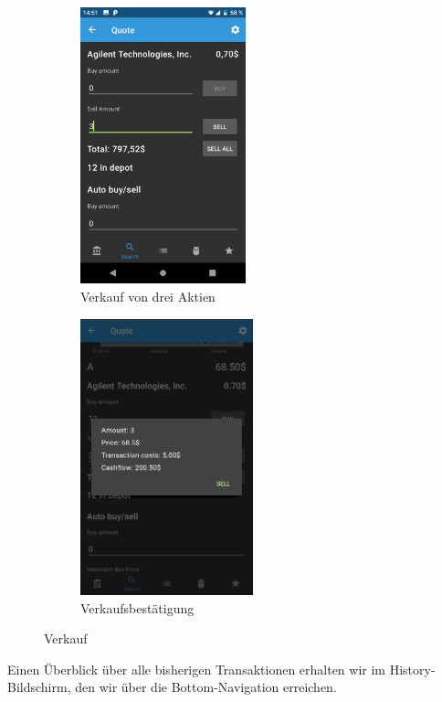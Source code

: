 \documentclass[a4paper]{article}
\begin{document}
\begin{figure}[H]
	\begin{subfigure}{.5\textwidth}
		\centering
		\includegraphics[height=8cm,keepaspectratio]{./images/demo/sell.png}
		\caption{Verkauf von drei Aktien}
		\label{fig:demo:sell_a_three}
	\end{subfigure}
	\begin{subfigure}{.5\textwidth}
		\centering
		\includegraphics[height=8cm,keepaspectratio]{./images/demo/sell_a_confirmation.png}
		\caption{Verkaufsbestätigung}
		\label{fig:demo:sell_a_confirmation}
	\end{subfigure}
	\caption{Verkauf}
	\label{fig:demo:sell_a}
\end{figure}

Einen Überblick über alle bisherigen Transaktionen erhalten wir im History-Bildschirm, den wir über die Bottom-Navigation erreichen. 
\end{document}
